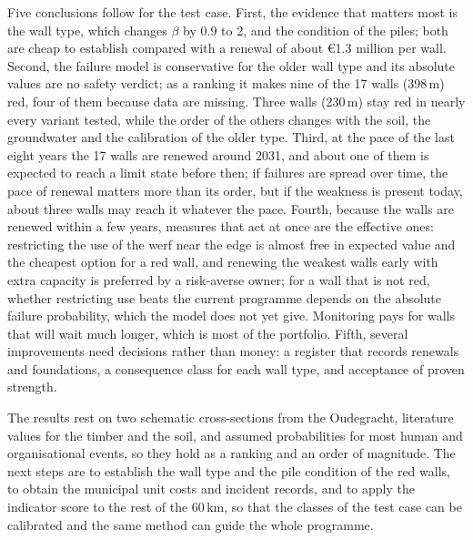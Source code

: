 Five conclusions follow for the test case. First, the evidence that matters
most is the wall type, which changes $\beta$ by 0.9 to 2, and the condition of
the piles; both are cheap to establish compared with a renewal of about
\euro1.3 million per wall. Second, the failure model is conservative for the
older wall type and its absolute values are no safety verdict; as a ranking it
makes nine of the 17 walls (398\,m) red, four of them because data are
missing. Three walls (230\,m) stay red in nearly every variant tested, while
the order of the others changes with the soil, the groundwater and the
calibration of the older type. Third, at the pace of the last eight
years the 17 walls are renewed around 2031, and about one of them is expected to
reach a limit state before then; if failures are spread over time, the pace of
renewal matters more than its order, but if the weakness is present today,
about three walls may reach it whatever the pace. Fourth, because the walls are renewed within a few years, measures that
act at once are the effective ones: restricting the use of the werf near the
edge is almost free in expected value and the cheapest option for a red wall,
and renewing the weakest walls early
with extra capacity is preferred by a risk-averse owner; for a wall that is not red, whether restricting use beats the current programme depends on the absolute failure probability, which the model does not yet give. Monitoring pays for walls that will wait much longer, which
is most of the portfolio. Fifth, several improvements need decisions rather
than money: a register that records renewals and foundations, a consequence
class for each wall type, and acceptance of proven strength.

The results rest on two schematic cross-sections from the Oudegracht, literature
values for the timber and the soil, and assumed probabilities for most human and
organisational events, so they hold as a ranking and an order of magnitude. The
next steps are to establish the wall type and the pile condition of the red
walls, to obtain the municipal unit costs and incident records, and to apply
the indicator score to the rest of the 60\,km, so that the classes of the test
case can be calibrated and the same method can guide the whole programme.
